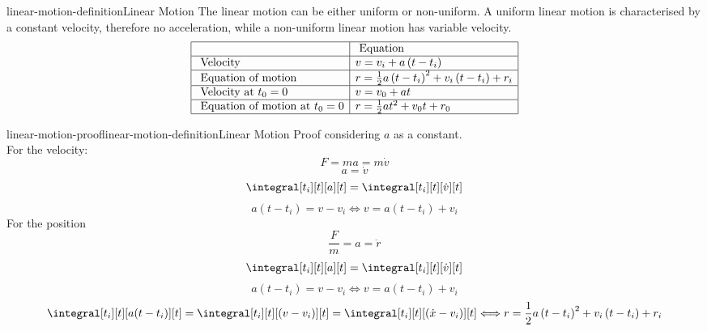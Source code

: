 \documentclass[preview]{standalone}
\begin{document}
\begin{snippetproposition}{linear-motion-definition}{Linear Motion}
    The linear motion can be either uniform or non-uniform. A uniform linear motion is characterised by a constant velocity, therefore no acceleration, while a non-uniform linear motion has variable velocity. \\
    $$ \begin{array}{|l|l|}
        \hline \text {  } & \text { Equation } \\
        \hline \text { Velocity } & v=v_i+a\left(t-t_i\right) \\
        \hline \text { Equation of motion } & r=\frac{1}{2} a\left(t-t_i\right)^2+v_i\left(t-t_i\right)+r_i \\
        \hline \text { Velocity at } t_0=0 & v=v_0+a t \\
        \hline \text { Equation of motion at } t_0=0 & r=\frac{1}{2} a t^2+v_0 t+r_0 \\
        \hline
    \end{array} $$
\end{snippetproposition}

\begin{snippetproof}{linear-motion-proof}{linear-motion-definition}{Linear Motion Proof }
    considering $a$ as a constant. \\
    For the velocity:
     $$ F = ma = m\dot{v} $$
     $$ a = \dot{v} $$
     $$ \integral[t_i][t][a][t] = \integral[t_i][t][\dot{v}][t] $$
     $$ a(t - t_i) = v - v_i \Longleftrightarrow v = a(t - t_i) + v_i $$
    For the position
    $$ \frac{F}{m} = a = \ddot{r} $$
    $$ \integral[t_i][t][a][t] = \integral[t_i][t][\dot{v}][t] $$
    $$ a(t - t_i) = v - v_i \Longleftrightarrow v = a(t - t_i) + v_i $$ 
    $$ \integral[t_i][t][a(t - t_i)][t] = \integral[t_i][t][\left( v - v_i \right)][t] = \integral[t_i][t][\left( \dot{x} - v_i \right)][t] \Longleftrightarrow r=\frac{1}{2} a\left(t-t_i\right)^2+v_i\left(t-t_i\right)+r_i $$
\end{snippetproof}
\end{document}
